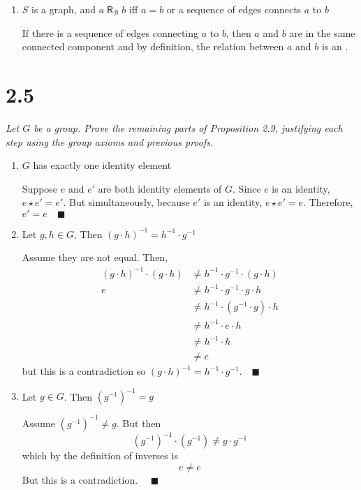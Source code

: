 \documentclass[12pt]{article}
\newcommand{\qed}{\quad \blacksquare}
\begin{document}
\begin{enumerate}[label=(\alph*)]
    \item $S$ is a graph, and $a\; \mathsf{R}_\mathcal{B} \; b \text{ iff } a = b$ or a sequence of edges connects $a$ to $b$
    
    \color{blue}
        If there is a sequence of edges connecting $a$ to $b$, then $a$ and $b$ are in the same connected component and by definition, the relation between $a$ and $b$ is an .
    \color{black}
\end{enumerate}
\pagebreak 

\section*{2.5} 
\emph{Let $G$ be a group. Prove the remaining parts of Proposition 2.9, justifying each step using the group axioms and previous proofs.}
\begin{enumerate}[label=(\alph*)]
    \item $G$ has exactly one identity element
    
    \color{blue}
    Suppose $e$ and $e'$ are both identity elements of $G$. Since $e$ is an identity, $e \star e' = e'$. But simultaneously, because $e'$ is an identity, $e \star e'= e$. Therefore, $e' = e \qed$
    \color{blue}

    \item Let $g, h \in G$, Then $(g \cdot h)^{-1} = h^{-1} \cdot g^{-1}$
    
    \color{blue}
    Assume they are not equal. Then, 
    \begin{align*}
        (g \cdot h)^{-1} \cdot (g \cdot h) &\neq h^{-1} \cdot g^{-1} \cdot (g \cdot h)\\
        e &\neq h^{-1} \cdot g^{-1} \cdot g \cdot h\\
        &\neq h^{-1} \cdot (g^{-1} \cdot g) \cdot h\\
        &\neq h^{-1} \cdot e \cdot h\\
        &\neq h^{-1}  \cdot h\\
        &\neq e
    \end{align*}
    but this is a contradiction so $(g \cdot h)^{-1} = h^{-1} \cdot g^{-1}. \qed$
    \color{black}

    \item Let $g \in G$. Then $(g^{-1})^{-1} = g$
    
    \color{blue}
        Assume $(g^{-1})^{-1} \neq g$. But then 
        \[(g^{-1})^{-1}\cdot (g^{-1}) \neq g \cdot g^{-1}\]
        which by the definition of inverses is 
        \[e \neq e\]
        But this is a contradiction. $\qed$
    \color{black}
\end{enumerate}
\pagebreak 
\end{document}
